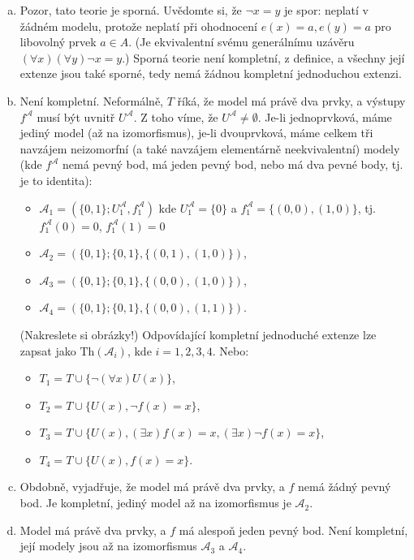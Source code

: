 \begin{problem}
    \begin{solution}
        \begin{enumerate}[(a)]
            \item Pozor, tato teorie je sporná. Uvědomte si, že $\neg x=y$ je spor: neplatí v žádném modelu, protože neplatí při ohodnocení $e(x)=a,e(y)=a$ pro libovolný prvek $a\in A$. (Je ekvivalentní svému generálnímu uzávěru $(\forall x)(\forall y)\neg x=y$.) Sporná teorie není kompletní, z definice, a všechny její extenze jsou také sporné, tedy nemá žádnou kompletní jednoduchou extenzi.
            \item Není kompletní. Neformálně, $T$ říká, že model má právě dva prvky, a výstupy $f^\mathcal A$ musí být uvnitř $U^\mathcal A$. Z toho víme, že $U^\mathcal A\neq\emptyset$. Je-li jednoprvková, máme jediný model (až na izomorfismus), je-li dvouprvková, máme celkem tři navzájem neizomorfní (a také navzájem elementárně neekvivalentní) modely (kde $f^\mathcal A$ nemá pevný bod, má jeden pevný bod, nebo má dva pevné body, tj. je to identita):
            \begin{itemize}
                \item $\mathcal A_1=(\{0,1\};U^\mathcal A_1,f^\mathcal A_1)$ kde $U^\mathcal A_1=\{0\}$ a $f^\mathcal A_1=\{(0,0),(1,0)\}$, tj. $f^\mathcal A_1(0)=0$, $f^\mathcal A_1(1)=0$
                \item $\mathcal A_2=(\{0,1\};\{0,1\},\{(0,1),(1,0)\})$,
                \item $\mathcal A_3=(\{0,1\};\{0,1\},\{(0,0),(1,0)\})$,
                \item $\mathcal A_4=(\{0,1\};\{0,1\},\{(0,0),(1,1)\})$.
            \end{itemize} 
            (Nakreslete si obrázky!) Odpovídající kompletní jednoduché extenze lze zapsat jako $\mathrm{Th}(\mathcal A_i)$, kde $i=1,2,3,4$. Nebo:
            \begin{itemize}
                \item $T_1=T\cup\{\neg (\forall x) U(x)\}$,
                \item $T_2=T\cup\{U(x),\neg f(x)=x\}$,
                \item $T_3=T\cup\{U(x),(\exists x)f(x)=x,(\exists x)\neg f(x)=x\}$,
                \item $T_4=T\cup\{U(x),f(x)=x\}$.
            \end{itemize}
            \item Obdobně, vyjadřuje, že model má právě dva prvky, a $f$ nemá žádný pevný bod. Je kompletní, jediný model až na izomorfismus je $\mathcal A_2$.
            \item Model má právě dva prvky, a $f$ má alespoň jeden pevný bod. Není kompletní, její modely jsou až na izomorfismus $\mathcal A_3$ a $\mathcal A_4$.
            

        \end{enumerate}
                    
    \end{solution}

\end{problem}
        
